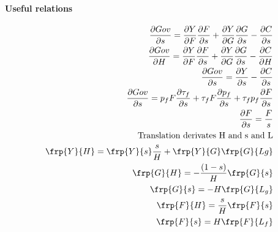 \paragraph{Useful relations}
\begin{align}
\frac{\partial Gov}{\partial s}=\frac{\partial Y}{\partial F}\frac{\partial F}{\partial s}+\frac{\partial Y}{\partial G}\frac{\partial G}{\partial s}-\frac{\partial C}{\partial s}\\
\frac{\partial Gov}{\partial H}=\frac{\partial Y}{\partial F}\frac{\partial F}{\partial s}+\frac{\partial Y}{\partial G}\frac{\partial G}{\partial s}-\frac{\partial C}{\partial H}\\
\frac{\partial Gov}{\partial s}=\frac{\partial Y}{\partial s}-\frac{\partial C}{\partial s}\\
\frac{\partial Gov}{\partial s}=p_f F \frac{\partial \tau_f}{\partial s}+\tau_f F \frac{\partial p_f}{\partial s}+\tau_f p_f \frac{\partial F}{\partial s}\\
\frac{\partial F}{\partial s}=\frac{F}{s}
\\
\text{Translation derivates H and s and L}\\
\frp{Y}{H}= \frp{Y}{s}\frac{s}{H}+\frp{Y}{G}\frp{G}{Lg}
\\
\frp{G}{H}=-\frac{(1-s)}{H}\frp{G}{s}
\\\frp{G}{s}=-H\frp{G}{L_g}\\
\frp{F}{H}=\frac{s}{H}\frp{F}{s}\\
\frp{F}{s}=H\frp{F}{L_f}
\end{align}


